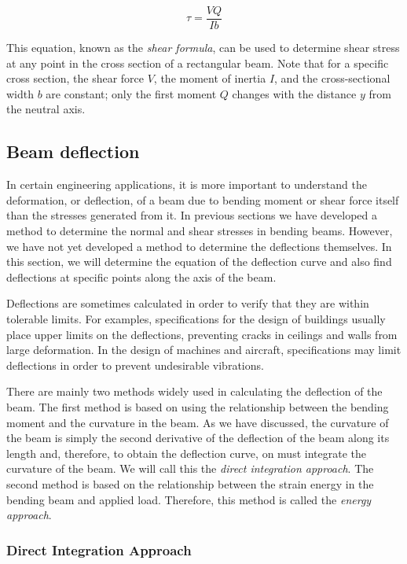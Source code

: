 \documentclass[
10pt,
a4paper,
openany,
svgnames,
]{book}
\begin{document}
\begin{equation}
  \tau  = \frac{VQ}{Ib}
\end{equation}

This equation, known as the \emph{shear formula}, can be used to determine shear stress at any point in the cross section of a rectangular beam. Note that for a specific cross section, the shear force $V$, the moment of inertia $I$, and the cross-sectional width $b$ are constant; only the first moment $Q$ changes with the distance $y$ from the neutral axis.

\subsection{Beam deflection} \label{subsection: beam deflection}

In certain engineering applications, it is more important to understand the deformation, or deflection, of a beam due to bending moment or shear force itself than the stresses generated from it. In previous sections we have developed a method to determine the normal and shear stresses in bending beams. However, we have not yet developed a method to determine the deflections themselves. In this section, we will determine the equation of the deflection curve and also find deflections at specific points along the axis of the beam.

Deflections are sometimes calculated in order to verify that they are within tolerable limits. For examples, specifications for the design of buildings usually place upper limits on the deflections, preventing cracks in ceilings and walls from large deformation. In the design of machines and aircraft, specifications may limit deflections in order to prevent undesirable vibrations.

There are mainly two methods widely used in calculating the deflection of the beam. The first method is based on using the relationship between the bending moment and the curvature in the beam. As we have discussed, the curvature of the beam is simply the second derivative of the deflection of the beam along its length and, therefore, to obtain the deflection curve, on must integrate the curvature of the beam. We will call this the \emph{direct integration approach}. The second method is based on the relationship between the strain energy in the bending beam and applied load. Therefore, this method is called the \emph{energy approach}.

\subsubsection{Direct Integration Approach}
\end{document}

